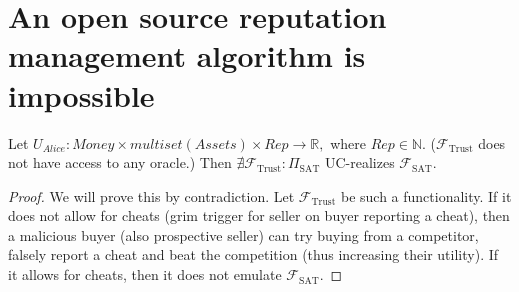 \section{An open source reputation management algorithm is impossible}
  \begin{theorem}
    Let $U_{Alice} : Money \times multiset\left(Assets\right) \times Rep \rightarrow
    \mathbb{R},$ where $Rep \in \mathbb{N}$. ($\mathcal{F}_{\mathrm{Trust}}$ does not have
    access to any oracle.) Then $\nexists \mathcal{F}_{\mathrm{Trust}}:
    \Pi_{\mathrm{SAT}}$ UC-realizes $\mathcal{F}_{\mathrm{SAT}}$.
  \end{theorem}
  \begin{proof}
    We will prove this by contradiction. Let $\mathcal{F}_{\mathrm{Trust}}$ be such a
    functionality. If it does not allow for cheats (grim trigger for seller on buyer
    reporting a cheat), then a malicious buyer (also prospective seller) can try buying
    from a competitor, falsely report a cheat and beat the competition (thus increasing
    their utility). If it allows for cheats, then it does not emulate
    $\mathcal{F}_{\mathrm{SAT}}$.
  \end{proof}
